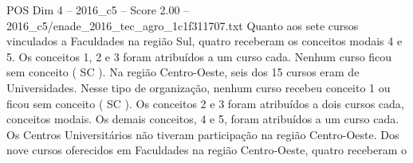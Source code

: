 \begin{textsample}{POS Dim 4 – 2016\_c5 – Score 2.00 – 2016\_c5/enade\_2016\_tec\_agro\_1c1f311707.txt}
Quanto aos sete cursos vinculados a Faculdades na região Sul, quatro receberam os conceitos modais 4 e 5.
Os conceitos 1, 2 e 3 foram atribuídos a um curso cada.
Nenhum curso ficou sem conceito ( SC ).
Na região Centro-Oeste, seis dos 15 cursos eram de Universidades.
Nesse tipo de organização, nenhum curso recebeu conceito 1 ou ficou sem conceito ( SC ).
Os conceitos 2 e 3 foram atribuídos a dois cursos cada, conceitos modais.
Os demais conceitos, 4 e 5, foram atribuídos a um curso cada.
Os Centros Universitários não tiveram participação na região Centro-Oeste.
Dos nove cursos oferecidos em Faculdades na região Centro-Oeste, quatro receberam o

\end{textsample}
